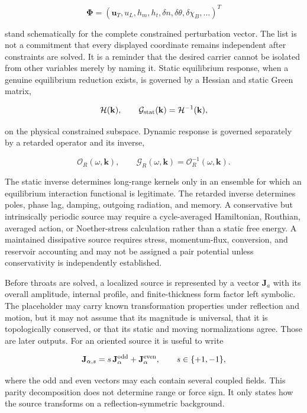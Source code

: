 \[
\bm{\Phi}
=
(\mathbf u_T,u_L,h_m,h_t,\delta n,\delta\theta,\delta\chi_B,\ldots)^T
\]

stand schematically for the complete constrained perturbation vector. The list
is not a commitment that every displayed coordinate remains independent after
constraints are solved. It is a reminder that the desired carrier cannot be
isolated from other variables merely by naming it. Static equilibrium response,
when a genuine equilibrium reduction exists, is governed by a Hessian and
static Green matrix,

\[
\mathcal H(\mathbf k),
\qquad
\mathcal G_{\rm stat}(\mathbf k)=\mathcal H^{-1}(\mathbf k),
\]

on the physical constrained subspace. Dynamic response is governed separately
by a retarded operator and its inverse,

\[
\mathcal O_R(\omega,\mathbf k),
\qquad
\mathcal G_R(\omega,\mathbf k)=\mathcal O_R^{-1}(\omega,\mathbf k).
\]

The static inverse determines long-range kernels only in an ensemble for which
an equilibrium interaction functional is legitimate. The retarded inverse
determines poles, phase lag, damping, outgoing radiation, and memory. A
conservative but intrinsically periodic source may require a cycle-averaged
Hamiltonian, Routhian, averaged action, or Noether-stress calculation rather
than a static free energy. A maintained dissipative source requires stress,
momentum-flux, conversion, and reservoir accounting and may not be assigned a
pair potential unless conservativity is independently established.

Before throats are solved, a localized source is represented by a vector
\(\mathbf{J}_a\) with its overall amplitude, internal profile, and
finite-thickness form factor left symbolic. The placeholder may carry known
transformation properties under reflection and motion, but it may not assume
that its magnitude is universal, that it is topologically conserved, or that
its static and moving normalizations agree. Those are later outputs. For an
oriented source it is useful to write

\[
\mathbf{J}_{\alpha,s}
=
 s\,\mathbf{J}^{\rm odd}_\alpha
+\mathbf{J}^{\rm even}_\alpha,
\qquad
s\in\{+1,-1\},
\]

where the odd and even vectors may each contain several coupled fields. This
parity decomposition does not determine range or force sign. It only states how
the source transforms on a reflection-symmetric background.

